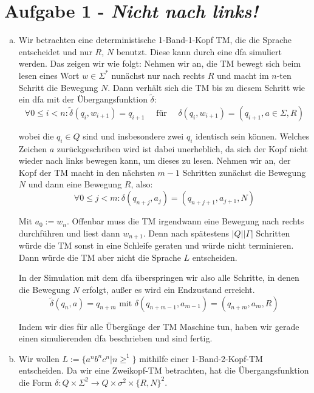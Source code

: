 \documentclass{article}
\begin{document}
\section*{Aufgabe 1 - \textit{Nicht nach links!}}
\begin{enumerate}[a)]
	\item Wir betrachten eine deterministische 1-Band-1-Kopf TM, die die Sprache entscheidet und nur $R$, $N$ benutzt. Diese kann durch eine dfa simuliert werden. Das zeigen wir wie folgt: Nehmen wir an, die TM bewegt sich beim lesen eines Wort $w \in \Sigma^*$ nunächst nur nach rechts $R$ und macht im $n$-ten Schritt die Bewegung $N$. Dann verhält sich die TM bis zu diesem Schritt wie ein dfa mit der Übergangsfunktion $\tilde{\delta}$:
	\begin{equation}
		\forall 0 \le i < n : \tilde{\delta}(q_i, w_{i+1}) = q_{i+1} \quad \text{ für } \quad \delta(q_i, w_{i+1}) = (q_{i+1},a\in \Sigma,R)
	\end{equation}
	
	wobei die $q_i \in Q$ sind und insbesondere zwei $q_i$ identisch sein können. Welches Zeichen $a$ zurückgeschriben wird ist dabei unerheblich, da sich der Kopf nicht wieder nach links bewegen kann, um dieses zu lesen. Nehmen wir an, der Kopf der TM macht in den nächsten $m-1$ Schritten zunächst die Bewegung $N$ und dann eine Bewegung $R$, also:
	\begin{equation}
		\forall 0 \le j < m: \delta(q_{n+j}, a_j) = (q_{n+j+1}, a_{j+1}, N)
	\end{equation}
	
	 Mit $a_0 := w_n$. Offenbar muss die TM irgendwann eine Bewegung nach rechts durchführen und liest dann $w_{n+1}$. Denn nach spätestens $|Q||\Gamma|$ Schritten würde die TM sonst in eine Schleife geraten und würde nicht terminieren. Dann würde die TM aber nicht die Sprache $L$ entscheiden.
	 
	 In der Simulation mit dem dfa überspringen wir also alle Schritte, in denen die Bewegung $N$ erfolgt, außer es wird ein Endzustand erreicht.
	 \begin{equation}
	 	\tilde{\delta}(q_n,a) = q_{n+m} \text{ mit } \delta(q_{n+m-1}, a_{m-1}) = (q_{n+m},a_m,R)
	 \end{equation}
	 
	 Indem wir dies für alle Übergänge der TM Maschine tun, haben wir gerade einen simulierenden dfa beschrieben und sind fertig.
	 
	\item Wir wollen $L :=  \{a^n b^n c^n | n \ge ^1\}$ mithilfe einer 1-Band-2-Kopf-TM entscheiden. Da wir eine Zweikopf-TM betrachten, hat die Übergangsfunktion die Form $\delta : Q \times \Sigma^2 \to Q\times \sigma^2 \times \{R,N\}^2$.
	

\end{enumerate}
\end{document}

